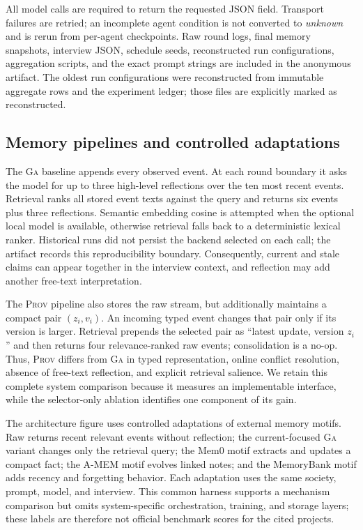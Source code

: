 \documentclass[sigconf,anonymous]{acmart}
\newcommand{\prov}{\textsc{Prov}}
\newcommand{\ga}{\textsc{Ga}}
\begin{document}
All model calls are required to return the requested JSON field.  Transport failures are retried;
an incomplete agent condition is not converted to \emph{unknown} and is rerun from per-agent
checkpoints.  Raw round logs, final memory snapshots, interview JSON, schedule seeds, reconstructed
run configurations, aggregation scripts, and the exact prompt strings are included in the
anonymous artifact.  The oldest run configurations were reconstructed from immutable aggregate
rows and the experiment ledger; those files are explicitly marked as reconstructed.

\subsection{Memory pipelines and controlled adaptations}

The \ga{} baseline appends every observed event.  At each round boundary it asks the model for up
to three high-level reflections over the ten most recent events.  Retrieval ranks all stored event
texts against the query and returns six events plus three reflections.  Semantic embedding cosine
is attempted when the optional local model is available, otherwise retrieval falls back to a
deterministic lexical ranker.  Historical runs did not persist the backend selected on each call;
the artifact records this reproducibility boundary.  Consequently, current and stale claims can appear together in the
interview context, and reflection may add another free-text interpretation.

The \prov{} pipeline also stores the raw stream, but additionally maintains a compact
pair $(z_i,v_i)$.  An incoming typed event changes that pair only if its version is larger.
Retrieval prepends the selected pair as ``latest update, version $z_i$'' and then returns four
relevance-ranked raw events; consolidation is a no-op.  Thus, \prov{} differs from \ga{} in typed
representation, online conflict resolution, absence of free-text reflection, and explicit
retrieval salience.  We retain this complete system comparison because it measures an implementable
interface, while the selector-only ablation identifies one component of its gain.

The architecture figure uses controlled adaptations of external memory motifs.  Raw returns
recent relevant events without reflection; the current-focused \ga{} variant changes only the
retrieval query; the Mem0 motif extracts and updates a compact fact; the A-MEM motif evolves
linked notes; and the MemoryBank motif adds recency and forgetting behavior.  Each adaptation
uses the same society, prompt, model, and interview.  This common harness supports a mechanism
comparison but omits system-specific orchestration, training, and storage layers; these labels
are therefore not official benchmark scores for the cited projects.
\end{document}
